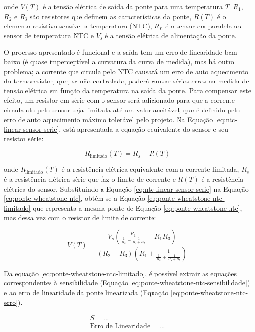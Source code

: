 \documentclass[a4paper]{instrumentacao}
\begin{document}
\noindent onde $V(T)$ é a tensão elétrica de saída da ponte para uma temperatura $T$, $R_1$, $R_2$ e $R_3$ são resistores que definem as características da ponte, $R(T)$ é o elemento resistivo sensível a temperatura (NTC), $R_L$ é o sensor em paralelo ao sensor de temperatura NTC e $V_s$ é a tensão elétrica de alimentação da ponte.

O processo apresentado é funcional e a saída tem um erro de linearidade bem baixo (é quase imperceptível a curvatura da curva de medida), mas há outro problema; a corrente que circula pelo NTC causará um erro de auto aquecimento do termoresistor, que, se não controlado, poderá causar sérios erros na medida de tensão elétrica em função da temperatura na saída da ponte. Para compensar este efeito, um resistor em série com o sensor será adicionado para que a corrente circulando pelo sensor seja limitada até um valor aceitável, que é definido pelo erro de auto aquecimento máximo tolerável pelo projeto. Na Equação \ref{eq:ntc-linear-sensor-serie}, está apresentada a equação equivalente do sensor e seu resistor série:

\begin{equation}
	R_{\text{limitado}}(T) = R_s + R(T)
	\label{eq:ntc-linear-sensor-serie}
\end{equation}

\noindent onde $R_{\text{limitado}}(T)$ é a resistência elétrica equivalente com a corrente limitada, $R_s$ é a resistência elétrica série que faz o limite de corrente e $R(T)$ é a resistência elétrica do sensor. Substituindo a Equação \ref{eq:ntc-linear-sensor-serie} na Equação \ref{eq:ponte-wheatstone-ntc}, obtém-se a Equação \ref{eq:ponte-wheatstone-ntc-limitado} que representa a mesma ponte de Equação \ref{eq:ponte-wheatstone-ntc}, mas dessa vez com o resistor de limite de corrente:

\begin{equation}
	V(T) = \frac{V_s \left(\frac{R_1}{\frac{1}{R_L}+\frac{1}{R_s+R_T}}-R_1 R_3\right)}{(R_2+R_3) \left(R_1+\frac{1}{\frac{1}{R_L}+\frac{1}{R_s+R_T}}\right)}
	\label{eq:ponte-wheatstone-ntc-limitado}
\end{equation}

Da equação \ref{eq:ponte-wheatstone-ntc-limitado}, é possível extrair as equações correspondentes à sensibilidade (Equação \ref{eq:ponte-wheatstone-ntc-sensibilidade}) e ao erro de linearidade da ponte linearizada  (Equação \ref{eq:ponte-wheatstone-ntc-erro}).

\begin{eqnarray}
	S 							= ...			\\ \label{eq:ponte-wheatstone-ntc-sensibilidade}
	\text{Erro de Linearidade} = ...			 	   \label{eq:ponte-wheatstone-ntc-erro}
\end{eqnarray}
\end{document}
